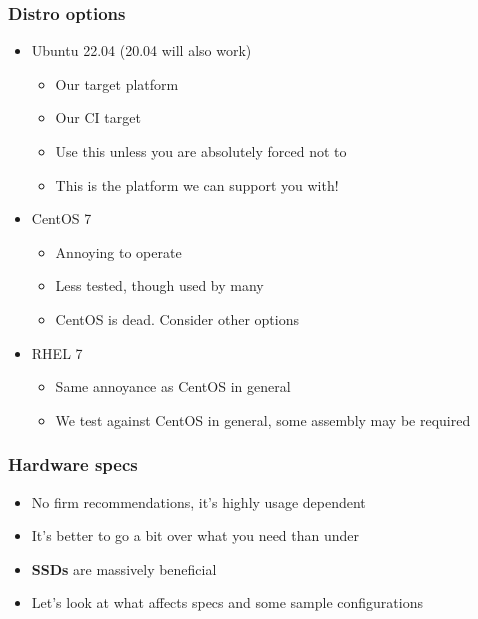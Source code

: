 \begin{frame}
    \frametitle{Distro options}
        \begin{itemize}
            \item Ubuntu 22.04 (20.04 will also work)
            \begin{itemize}
                \item Our target platform
                \item Our CI target
                \item Use this unless you are absolutely forced not to
                \item This is the platform we can support you with!
            \end{itemize}
            \item CentOS 7
            \begin{itemize}
                \item Annoying to operate
                \item Less tested, though used by many
                \item CentOS is dead. Consider other options
            \end{itemize}
            \item RHEL 7
            \begin{itemize}
                \item Same annoyance as CentOS in general
                \item We test against CentOS in general, some assembly may be required
            \end{itemize}
        \end{itemize}
\end{frame}

\begin{frame}
\frametitle{Hardware specs}
    \begin{itemize}
        \item No firm recommendations, it's highly usage dependent
        \item It's better to go a bit over what you need than under
        \item {\bf SSDs} are massively beneficial
        \item Let's look at what affects specs and some sample configurations
    \end{itemize}
\end{frame}

